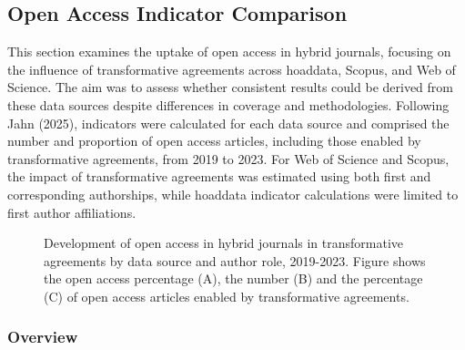 \documentclass[a4paper,man,floatsintext,longtable,noextraspace,10pt]{apa6}
\begin{document}
\subsection{Open Access Indicator
Comparison}\label{open-access-indicator-comparison}

This section examines the uptake of open access in hybrid journals,
focusing on the influence of transformative agreements across hoaddata,
Scopus, and Web of Science. The aim was to assess whether consistent
results could be derived from these data sources despite differences in
coverage and methodologies. Following Jahn (2025), indicators were
calculated for each data source and comprised the number and proportion
of open access articles, including those enabled by transformative
agreements, from 2019 to 2023. For Web of Science and Scopus, the impact
of transformative agreements was estimated using both first and
corresponding authorships, while hoaddata indicator calculations were
limited to first author affiliations.

\begin{figure}[ht!]


\caption{\label{fig-uptake_overview}Development of open access in hybrid
journals in transformative agreements by data source and author role,
2019-2023. Figure shows the open access percentage (A), the number (B)
and the percentage (C) of open access articles enabled by transformative
agreements.}

\end{figure}%

\subsubsection{Overview}\label{overview-1}
\end{document}
